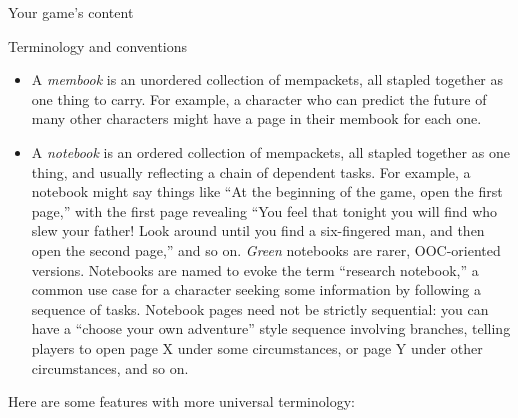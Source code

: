 \documentclass{article}
\begin{document}
\begin{section}{Your game's content}
\begin{subsection}{Terminology and conventions}
\begin{itemize}
    \item A \textit{membook} is an unordered collection of mempackets, all stapled together as one thing to carry.  For example, a character who can predict the future of many other characters might have a page in their membook for each one.
    \item A \textit{notebook} is an ordered collection of mempackets, all stapled together as one thing, and usually reflecting a chain of dependent tasks.  For example, a notebook might say things like ``At the beginning of the game, open the first page,'' with the first page revealing ``You feel that tonight you will find who slew your father!  Look around until you find a six-fingered man, and then open the second page,'' and so on.  \textit{Green} notebooks are rarer, OOC-oriented versions.  Notebooks are named to evoke the term ``research notebook,'' a common use case for a character seeking some information by following a sequence of tasks.
    Notebook pages need not be strictly sequential: you can have a ``choose your own adventure'' style sequence involving branches, telling players to open page X under some circumstances, or page Y under other circumstances, and so on.
\end{itemize}

Here are some \gametex{} features with more universal terminology:


\end{subsection}
\end{section}
\end{document}
